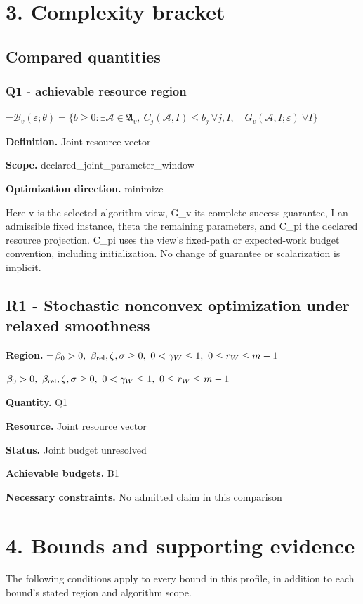 \documentclass[10pt,a4paper]{article}
\newcommand{\AtlasMath}[1]{\par\begingroup\centering\setbox0=\hbox{$\displaystyle #1$}\ifdim\wd0>1.4\linewidth\typeout{ATLAS WIDE FORMULA: \the\wd0}\fi\ifdim\wd0>\linewidth\resizebox{\linewidth}{!}{\box0}\else\box0\fi\par\endgroup}
\newcommand{\AtlasInlineMath}[1]{\begingroup\setbox0=\hbox{$#1$}\ifdim\wd0>.4\linewidth\endgroup\AtlasMath{#1}\else\endgroup$#1$\fi}
\begin{document}
\section{3. Complexity bracket}
\subsection{Compared quantities}
\subsubsection{Q1 - achievable resource region}
\AtlasMath{\mathcal B_v(\varepsilon;\theta)=\{b\ge0:\exists\mathcal A\in\mathfrak A_v,\ C_j(\mathcal A,I)\le b_j\ \forall j,I,\quad G_v(\mathcal A,I;\varepsilon)\ \forall I\}}
\textbf{Definition.} Joint resource vector

\textbf{Scope.} declared\_joint\_parameter\_window

\textbf{Optimization direction.} minimize

Here v is the selected algorithm view, G\_v its complete success guarantee, I an admissible fixed instance, theta the remaining parameters, and C\_pi the declared resource projection. C\_pi uses the view's fixed-path or expected-work budget convention, including initialization. No change of guarantee or scalarization is implicit.

\subsection{R1 - Stochastic nonconvex optimization under relaxed smoothness}
\textbf{Region.} \AtlasInlineMath{\beta_0>0,\ \beta_{\rm rel},\zeta,\sigma\ge0,\ 0<\gamma_W\le1,\ 0\le r_W\le m-1}

\textbf{Quantity.} Q1

\textbf{Resource.} Joint resource vector

\textbf{Status.} Joint budget unresolved

\textbf{Achievable budgets.} B1

\textbf{Necessary constraints.} No admitted claim in this comparison

\section{4. Bounds and supporting evidence}
The following conditions apply to every bound in this profile, in addition to each bound's stated region and algorithm scope.
\end{document}
